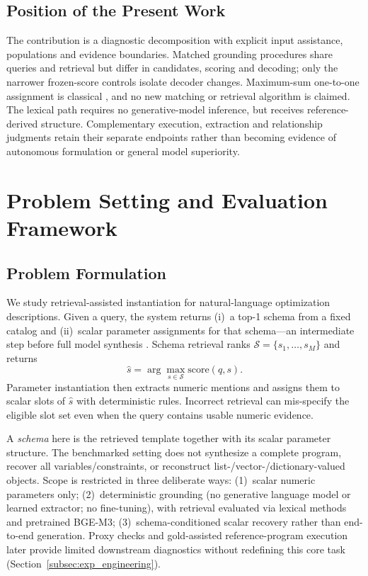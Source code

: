 \documentclass[pdflatex,iicol,sn-basic,Numbered]{sn-jnl}
\begin{document}
\subsection{Position of the Present Work}
\label{subsec:rw_position}
The contribution is a diagnostic decomposition with explicit input assistance, populations and evidence boundaries. Matched grounding procedures share queries and retrieval but differ in candidates, scoring and decoding; only the narrower frozen-score controls isolate decoder changes. Maximum-sum one-to-one assignment is classical \cite{kuhn1955assignment}, and no new matching or retrieval algorithm is claimed. The lexical path requires no generative-model inference, but receives reference-derived structure. Complementary execution, extraction and relationship judgments retain their separate endpoints rather than becoming evidence of autonomous formulation or general model superiority.

\section{Problem Setting and Evaluation Framework}
\label{sec:task}
\subsection{Problem Formulation}
\label{subsec:method_problem}

We study retrieval-assisted instantiation for natural-language optimization descriptions. Given a query, the system returns (i)~a top-1 schema from a fixed catalog and (ii)~scalar parameter assignments for that schema---an intermediate step before full model synthesis \cite{nlp4lp_dataset,ramamonjison2023nl4opt,ahmaditeshnizi2024optimus_icml}. Schema retrieval ranks $\mathcal{S}=\{s_1,\dots,s_M\}$ and returns
\begin{equation}
\hat{s}=\arg\max_{s \in \mathcal{S}} \mathrm{score}(q,s).
\label{eq:top1_schema}
\end{equation}
Parameter instantiation then extracts numeric mentions and assigns them to scalar slots of $\hat{s}$ with deterministic rules. Incorrect retrieval can mis-specify the eligible slot set even when the query contains usable numeric evidence.

A \emph{schema} here is the retrieved template together with its scalar parameter structure. The benchmarked setting does not synthesize a complete program, recover all variables/constraints, or reconstruct list-/vector-/dictionary-valued objects. Scope is restricted in three deliberate ways: (1)~scalar numeric parameters only; (2)~deterministic grounding (no generative language model or learned extractor; no fine-tuning), with retrieval evaluated via lexical methods and pretrained BGE-M3; (3)~schema-conditioned scalar recovery rather than end-to-end generation. Proxy checks and gold-assisted reference-program execution later provide limited downstream diagnostics without redefining this core task (Section~\ref{subsec:exp_engineering}).
\end{document}
